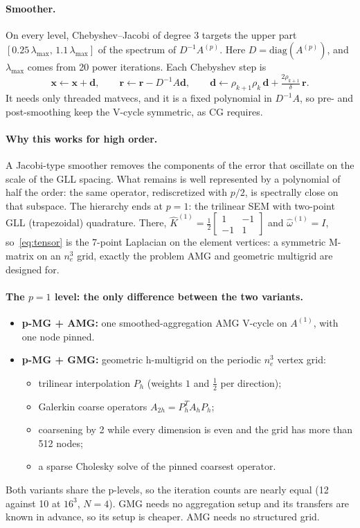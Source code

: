 \documentclass[11pt]{article}
\newcommand{\Khat}{\widehat{K}}
\newcommand{\What}{\widehat{\omega}}
\begin{document}
\paragraph{Smoother.} On every level, Chebyshev--Jacobi of degree 3 targets the upper part
$[0.25\,\lambda_{\max},\,1.1\,\lambda_{\max}]$ of the spectrum of $D^{-1}A^{(p)}$. Here $D=\mathrm{diag}(A^{(p)})$,
and $\lambda_{\max}$ comes from 20 power iterations. Each Chebyshev step is
\[
  \mathbf{x}\leftarrow\mathbf{x}+\mathbf{d},\qquad
  \mathbf{r}\leftarrow\mathbf{r}-D^{-1}A\mathbf{d},\qquad
  \mathbf{d}\leftarrow\rho_{k+1}\rho_k\,\mathbf{d}+\tfrac{2\rho_{k+1}}{\delta}\,\mathbf{r}.
\]
It needs only threaded matvecs, and it is a fixed polynomial in $D^{-1}A$, so pre- and post-smoothing keep
the V-cycle symmetric, as CG requires.

\paragraph{Why this works for high order.} A Jacobi-type smoother removes the components of the error
that oscillate on the scale of the GLL spacing. What remains is well represented by a polynomial of
half the order: the same operator, rediscretized with $p/2$, is spectrally close on that subspace.
The hierarchy ends at $p=1$: the trilinear SEM with two-point GLL (trapezoidal) quadrature. There,
$\Khat^{(1)}=\tfrac12\begin{bmatrix}1&-1\\-1&1\end{bmatrix}$ and $\What^{(1)}=I$, so~\eqref{eq:tensor} is the
7-point Laplacian on the element vertices: a symmetric M-matrix on an $n_e^3$ grid, exactly the problem
AMG and geometric multigrid are designed for.

\paragraph{The $p=1$ level: the only difference between the two variants.}
\begin{itemize}
  \item \textbf{p-MG + AMG:} one smoothed-aggregation AMG V-cycle on $A^{(1)}$, with one node pinned.
  \item \textbf{p-MG + GMG:} geometric h-multigrid on the periodic $n_e^3$ vertex grid:
        \begin{itemize}
          \item trilinear interpolation $P_h$ (weights $1$ and $\tfrac12$ per direction);
          \item Galerkin coarse operators $A_{2h}=P_h^TA_hP_h$;
          \item coarsening by 2 while every dimension is even and the grid has more than 512 nodes;
          \item a sparse Cholesky solve of the pinned coarsest operator.
        \end{itemize}
\end{itemize}
Both variants share the p-levels, so the iteration counts are nearly equal (12 against 10 at $16^3$, $N=4$). GMG needs
no aggregation setup and its transfers are known in advance, so its setup is cheaper. AMG needs no
structured grid.
\end{document}
